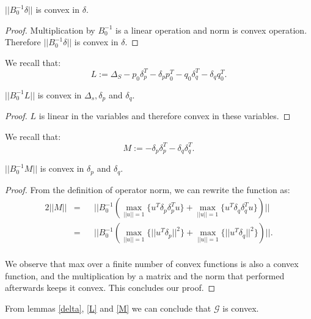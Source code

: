\begin{lemma} \label{delta}
$||B_0^{-1}\delta||$ is convex in $\delta$.
\end{lemma}
\begin{proof}
Multiplication by $B_0^{-1}$ is a linear operation and norm is convex
operation. Therefore $||B_0^{-1}\delta||$ is convex in $\delta$.
\end{proof}

We recall that:
\begin{equation*}
L:= \Delta_S - p_0\delta_p^T - \delta_pp_0^T - q_0\delta_q^T - \delta_qq_0^T.
\end{equation*}
\begin{lemma} \label{L}
$||B_0^{-1}L||$ is convex in $\Delta_s, \delta_p$
and $\delta_q$.
\end{lemma}
\begin{proof}
$L$ is linear in the variables and therefore convex in these variables.

\end{proof}

We recall that:
\begin{equation*}
M:= - \delta_p\delta_p^T - \delta_q\delta_q^T.
\end{equation*}

\begin{lemma} \label{M}
$||B_0^{-1}M||$ is convex in $\delta_p$
and $\delta_q$.
\end{lemma}
\begin{proof}
From the definition of operator norm, we can rewrite the function as:
\begin{alignat*} {2}
||M|| & = && ||B_0^{-1}(\max_{||u||=1}{\{u^T \delta_p\delta_p^T u\}} +
\max_{||u||=1}{\{u^T \delta_q\delta_q^T u\}})||\\
& = && ||B_0^{-1}(\max_{||u||=1}{\{||u^T \delta_p||^2\}} +
\max_{||u||=1}{\{||u^T \delta_q||^2\}})||.
\end{alignat*}
\\We observe that max over a finite number of convex functions is also a convex
function, and the multiplication by a matrix and the norm that performed afterwards keeps it convex.
This concludes our proof.
\end{proof}

\begin{corollary}
From lemmas \ref{delta}, \ref{L} and \ref{M} we can conclude that $\mathcal{G}$
is convex.
\end{corollary}




